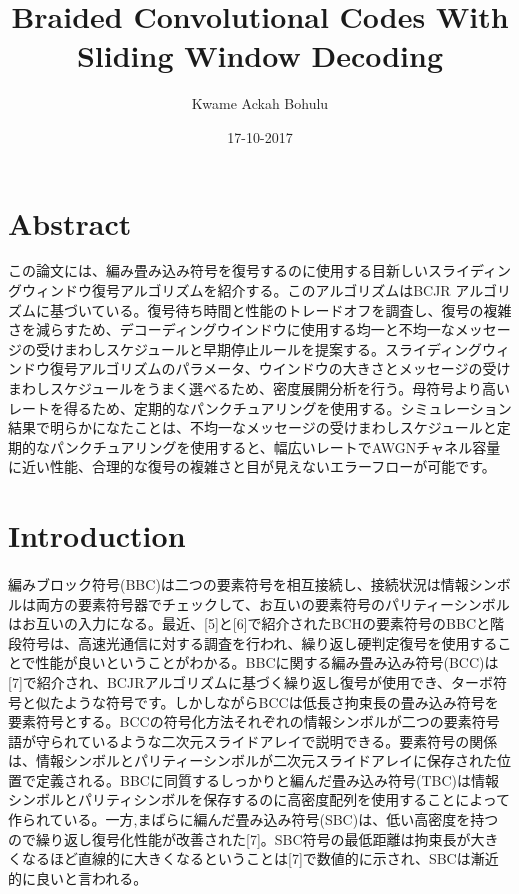 \documentclass[20 pts]{article}
\title{Braided Convolutional Codes With Sliding Window Decoding}
\author{Kwame Ackah Bohulu}
\date{17-10-2017}
\begin{document}
\maketitle

\newpage
 \section{Abstract}
 この論文には、編み畳み込み符号を復号するのに使用する目新しいスライディングウィンドウ復号アルゴリズムを紹介する。このアルゴリズムはBCJR	アルゴリズムに基づいている。復号待ち時間と性能のトレードオフを調査し、復号の複雑さを減らすため、デコーディングウインドウに使用する均一と不均一なメッセージの受けまわしスケジュールと早期停止ルールを提案する。スライディングウィンドウ復号アルゴリズムのパラメータ、ウインドウの大きさとメッセージの受けまわしスケジュールをうまく選べるため、密度展開分析を行う。母符号より高いレートを得るため、定期的なパンクチュアリングを使用する。シミュレーション結果で明らかになたことは、不均一なメッセージの受けまわしスケジュールと定期的なパンクチュアリングを使用すると、幅広いレートでAWGNチャネル容量に近い性能、合理的な復号の複雑さと目が見えないエラーフローが可能です。
 \section{Introduction}
 \paragraph{}
 編みブロック符号(BBC)は二つの要素符号を相互接続し、接続状況は情報シンボルは両方の要素符号器でチェックして、お互いの要素符号のパリティーシンボルはお互いの入力になる。最近、[5]と[6]で紹介されたBCHの要素符号のBBCと階段符号は、高速光通信に対する調査を行われ、繰り返し硬判定復号を使用することで性能が良いということがわかる。BBCに関する編み畳み込み符号(BCC)は[7]で紹介され、BCJRアルゴリズムに基づく繰り返し復号が使用でき、ターボ符号と似たような符号です。しかしながらBCCは低長さ拘束長の畳み込み符号を要素符号とする。BCCの符号化方法それぞれの情報シンボルが二つの要素符号語が守られているような二次元スライドアレイで説明できる。要素符号の関係は、情報シンボルとパリティーシンボルが二次元スライドアレイに保存された位置で定義される。BBCに同質するしっかりと編んだ畳み込み符号(TBC)は情報シンボルとパリティシンボルを保存するのに高密度配列を使用することによって作られている。一方,まばらに編んだ畳み込み符号(SBC)は、低い高密度を持つので繰り返し復号化性能が改善された[7]。SBC符号の最低距離は拘束長が大きくなるほど直線的に大きくなるということは[7]で数値的に示され、SBCは漸近的に良いと言われる。
\end{document}

